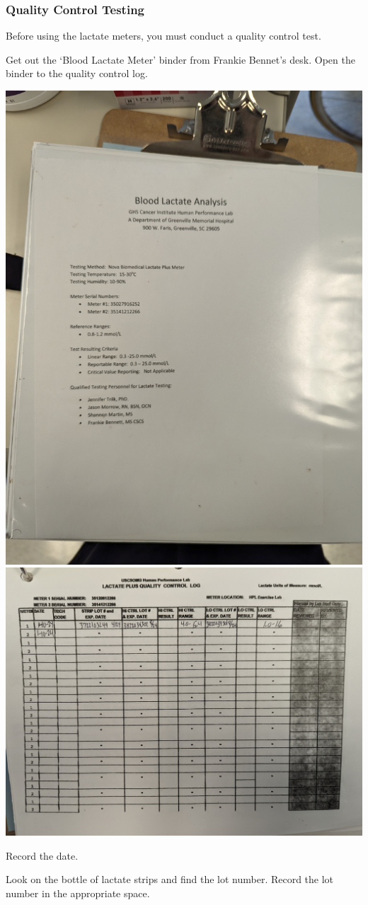 \documentclass[
]{book}
\begin{document}
\hypertarget{Appendix-Instruments-LactateMeter-Usage-QualityControl}{%
\subsubsection{Quality Control Testing}\label{Appendix-Instruments-LactateMeter-Usage-QualityControl}}

Before using the lactate meters, you must conduct a quality control test.

Get out the `Blood Lactate Meter' binder from Frankie Bennet's desk. Open the binder to the quality control log.

\includegraphics[width=0.5\linewidth]{images/lactatequalitycontrol/lactatebinder}
\includegraphics[width=0.5\linewidth]{images/lactatequalitycontrol/lactatebinder_log}

Record the date.

Look on the bottle of lactate strips and find the lot number. Record the lot number in the appropriate space.
\end{document}

